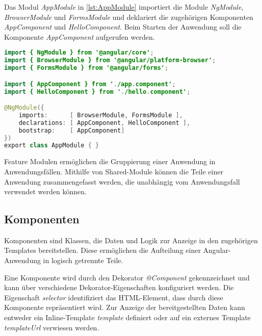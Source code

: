 Das Modul \textit{AppModule} in \autoref{lst:AppModule} importiert die Module \textit{NgModule}, \textit{BrowserModule} und \textit{FormsModule} und deklariert die zugehörigen Komponenten \textit{AppComponent} und \textit{HelloComponent}. Beim Starten der Anwendung soll die Komponente \textit{AppComponent} aufgerufen werden.

\begin{lstlisting}[caption=Das Root-Module in der Datei app.module.ts, label=lst:AppModule, language=Java]
import { NgModule } from '@angular/core';
import { BrowserModule } from '@angular/platform-browser';
import { FormsModule } from '@angular/forms';

import { AppComponent } from './app.component';
import { HelloComponent } from './hello.component';

@NgModule({
	imports:      [ BrowserModule, FormsModule ],
	declarations: [ AppComponent, HelloComponent ],
	bootstrap:    [ AppComponent]
})
export class AppModule { }

\end{lstlisting}

Feature Modulen ermöglichen die Gruppierung einer Anwendung in Anwendungsfällen. Mithilfe von Shared-Module können die Teile einer Anwendung zusammengefasst werden, die unabhängig vom Anwendungsfall verwendet werden können. \autocites[vgl.][528\psqq]{Freeman.2018}[vgl.][]{Google.c}[vgl.][105\psqq]{Steyer.2017}

\subsection{Komponenten}

Komponenten sind Klassen, die Daten und Logik zur Anzeige in den zugehörigen Templates bereitstellen. Diese ermöglichen die Aufteilung einer Angular-Anwendung in logisch getrennte Teile. \autocite[vgl.][401]{Freeman.2018} 

Eine Komponente wird durch den Dekorator \textit{@Component} gekennzeichnet und kann über verschiedene Dekorator-Eigenschaften konfiguriert werden. Die Eigenschaft \textit{selector} identifiziert das HTML-Element, dass durch diese Komponente repräsentiert wird. Zur Anzeige der bereitgestellten Daten kann entweder ein Inline-Template \textit{template} definiert oder auf ein externes Template \textit{templateUrl} verwiesen werden. \autocites[vgl.][]{Google.b}[vgl.][405]{Freeman.2018}[vgl.][47\psqq]{Steyer.2017}

